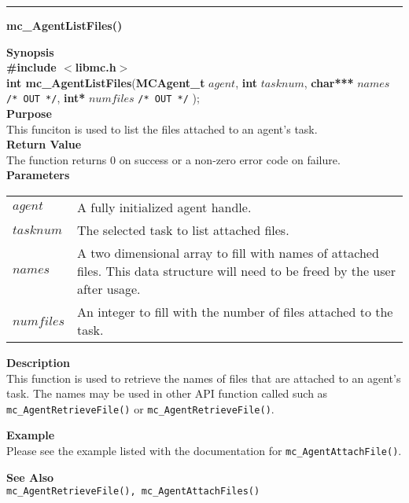 \noindent
\vspace{5pt}
\rule{6.5in}{0.015in}
\noindent
{}
{\LARGE \bf mc\_AgentListFiles()}\\

\noindent
{\bf Synopsis}\\
{\bf \#include $<$libmc.h$>$}\\
{\bf int mc\_AgentListFiles}({\bf MCAgent\_t} $agent$, 
                                  {\bf int} $tasknum$,
                                  {\bf char***} $names$ \texttt{/* OUT */},
                                  {\bf int*} $numfiles$ \texttt{/* OUT */}
																	);\\

\noindent
{\bf Purpose}\\
This funciton is used to list the files attached to an agent's task.\\

\noindent
{\bf Return Value}\\
The function returns 0 on success or a non-zero error code on failure.\\

\noindent
{\bf Parameters}
\vspace{-0.1in}
\begin{description}
\item
\begin{tabular}{p{30 mm}p{125 mm}} 
$agent$ & A fully initialized agent handle.\\
$tasknum$ & The selected task to list attached files.\\
$names$ & A two dimensional array to fill with names of attached files. This
data structure will need to be freed by the user after usage.\\
$numfiles$ & An integer to fill with the number of files attached to the task.
\end{tabular}
\end{description}

\noindent
{\bf Description}\\
This function is used to retrieve the names of files that are attached to an
agent's task. The names may be used in other API function called such as
\texttt{mc\_AgentRetrieveFile()} or \texttt{mc\_AgentRetrieveFile()}.

\noindent
{\bf Example}\\
\noindent
Please see the example listed with the documentation for
\texttt{mc\_AgentAttachFile()}.

\noindent
{\bf See Also}\\
\texttt{mc\_AgentRetrieveFile(), mc\_AgentAttachFiles()}

